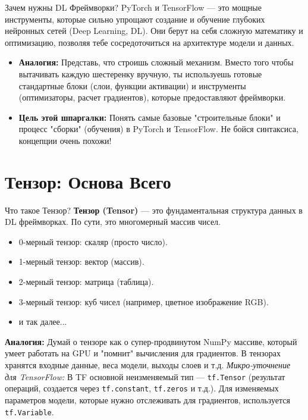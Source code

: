 
\begin{textbox}{Зачем нужны DL Фреймворки?}
    PyTorch и TensorFlow --- это мощные инструменты, которые сильно упрощают создание и обучение глубоких нейронных сетей (Deep Learning, DL). Они берут на себя сложную математику и оптимизацию, позволяя тебе сосредоточиться на архитектуре модели и данных.
    \begin{itemize}
        \item \textbf{Аналогия:} Представь, что строишь сложный механизм. Вместо того чтобы вытачивать каждую шестеренку вручную, ты используешь готовые стандартные блоки (слои, функции активации) и инструменты (оптимизаторы, расчет градиентов), которые предоставляют фреймворки.
        \item \textbf{Цель этой шпаргалки:} Понять самые базовые "строительные блоки" и процесс "сборки" (обучения) в PyTorch и TensorFlow. Не бойся синтаксиса, концепции очень похожи!
    \end{itemize}
\end{textbox}

\section{Тензор: Основа Всего}

\begin{myblock}{Что такое Тензор?}
    \textbf{Тензор (Tensor)} --- это фундаментальная структура данных в DL фреймворках. По сути, это многомерный массив чисел.
    \begin{itemize}
        \item 0-мерный тензор: скаляр (просто число).
        \item 1-мерный тензор: вектор (массив).
        \item 2-мерный тензор: матрица (таблица).
        \item 3-мерный тензор: куб чисел (например, цветное изображение RGB).
        \item и так далее...
    \end{itemize}
    \textbf{Аналогия:} Думай о тензоре как о супер-продвинутом NumPy массиве, который умеет работать на GPU и "помнит" вычисления для градиентов.
    В тензорах хранятся входные данные, веса модели, выходы слоев и т.д.
    \textit{Микро-уточнение для TensorFlow:} В TF основной неизменяемый тип — \texttt{tf.Tensor} (результат операций, создается через \texttt{tf.constant}, \texttt{tf.zeros} и т.д.). Для изменяемых параметров модели, которые нужно отслеживать для градиентов, используется \texttt{tf.Variable}.
\end{myblock}

